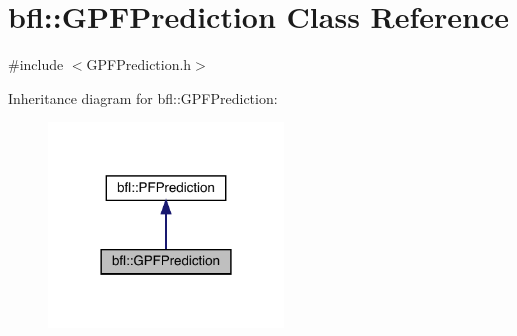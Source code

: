 \hypertarget{classbfl_1_1GPFPrediction}{}\section{bfl\+:\+:G\+P\+F\+Prediction Class Reference}
\label{classbfl_1_1GPFPrediction}


{\ttfamily \#include $<$G\+P\+F\+Prediction.\+h$>$}



Inheritance diagram for bfl\+:\+:G\+P\+F\+Prediction\+:
\nopagebreak
\begin{figure}[H]
\begin{center}
\leavevmode
\includegraphics[width=177pt]{classbfl_1_1GPFPrediction__inherit__graph}
\end{center}
\end{figure}
